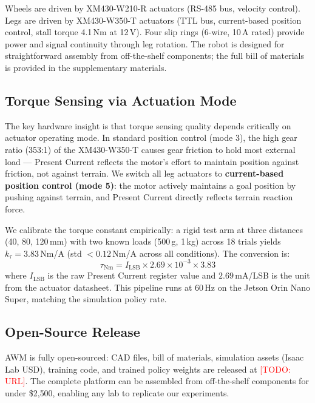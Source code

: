 \documentclass{article}
\newcommand{\todo}[1]{\textcolor{red}{[TODO: #1]}}
\begin{document}
Wheels are driven by XM430-W210-R actuators (RS-485 bus, velocity control). Legs are
driven by XM430-W350-T actuators (TTL bus, current-based position control, stall torque
4.1\,Nm at 12\,V). Four slip rings (6-wire, 10\,A rated) provide power and signal
continuity through leg rotation. The robot is designed for straightforward assembly from
off-the-shelf components; the full bill of materials is provided in the supplementary
materials.

\subsection{Torque Sensing via Actuation Mode}
\label{sec:torque_sensing}

The key hardware insight is that torque sensing quality depends critically on actuator
operating mode. In standard position control (mode 3), the high gear ratio (353:1) of the
XM430-W350-T causes gear friction to hold most external load --- Present Current reflects
the motor's effort to maintain position against friction, not against terrain. We switch
all leg actuators to \textbf{current-based position control (mode 5)}: the motor
actively maintains a goal position by pushing against terrain, and Present Current directly
reflects terrain reaction force.

We calibrate the torque constant empirically: a rigid test arm at three distances (40,
80, 120\,mm) with two known loads (500\,g, 1\,kg) across 18 trials yields
$k_\tau = 3.83$\,Nm/A (std $< 0.12$\,Nm/A across all conditions). The conversion is:
\begin{equation}
    \tau_\text{Nm} = I_\text{LSB} \times 2.69 \times 10^{-3} \times 3.83
    \label{eq:torque}
\end{equation}
where $I_\text{LSB}$ is the raw Present Current register value and $2.69$\,mA/LSB is
the unit from the actuator datasheet. This pipeline runs at 60\,Hz on the Jetson Orin
Nano Super, matching the simulation policy rate.

\subsection{Open-Source Release}

AWM is fully open-sourced: CAD files, bill of materials, simulation assets (Isaac Lab USD),
training code, and trained policy weights are released at \todo{URL}. The complete
platform can be assembled from off-the-shelf components for under \$2{,}500, enabling
any lab to replicate our experiments.
\end{document}
